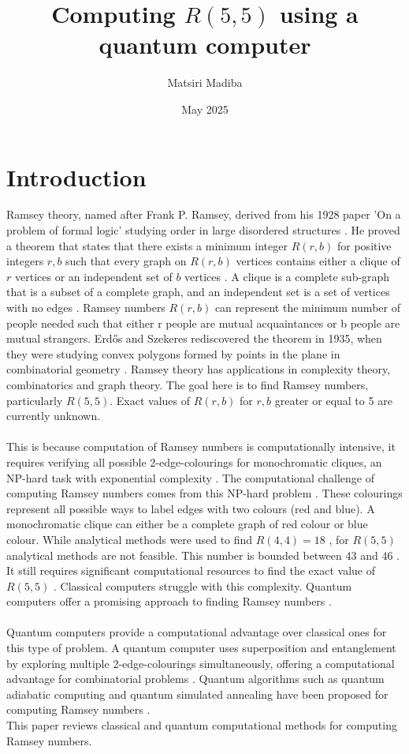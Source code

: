 \documentclass{Assignment}
\author{Matsiri Madiba}
\date{May 2025}
\title{Computing $R(5,5)$ using a quantum computer}
\begin{document}
\maketitle
\newpage
\tableofcontents
\newpage
\section{Introduction}
Ramsey theory, named after Frank P. Ramsey, derived from his 1928 paper 'On a problem of formal logic' studying order in large disordered structures \cite{graham1980ramsey}.
He proved a theorem that states that there exists a minimum integer $R(r,b)$ for positive integers $r, b$ such that every graph on $R(r,b)$ vertices contains either a clique of $r$ vertices or an independent set of $b$ vertices \cite{BondyMurty2008}.
A clique is a complete sub-graph that is a subset of a complete graph, and an independent set is a set of vertices with no edges \cite{BondyMurty2008}.	
Ramsey numbers $R(r,b)$ can represent the minimum number of people needed such that either r people are mutual acquaintances or b people are mutual strangers.
Erd\H{o}s and Szekeres rediscovered the theorem in 1935, when they were studying convex polygons formed by points in the plane in combinatorial geometry \cite{BondyMurty2008}.
Ramsey theory has applications in complexity theory, combinatorics and graph theory. 
The goal here is to find Ramsey numbers, particularly $R(5,5)$.
Exact values of $R(r,b)$ for $r,b$ greater or equal to 5 are currently unknown.
\\\\
This is because computation of Ramsey numbers is computationally intensive, it requires verifying all possible 2-edge-colourings for monochromatic cliques, an NP-hard task with exponential complexity \cite{PhysRevA.93.032301, burr1981generalized}.
The computational challenge of computing Ramsey numbers comes from this NP-hard problem \cite{burr1981generalized}.
These colourings represent all possible ways to label edges with two colours (red and blue).
A monochromatic clique can either be a complete graph of red colour or blue colour.
While analytical methods were used to find $R(4,4)=18$ \cite{GreenwoodGleason1955},
for $R(5,5)$ analytical methods are not feasible.
This number is bounded between 43 \cite{Exoo1993} and 46 \cite{angeltveit2024r55le46}.
It still requires significant computational resources to find the exact value of $R(5,5)$ \cite{spencer1994}.
Classical computers struggle with this complexity.
Quantum computers offer a promising approach to finding Ramsey numbers \cite{PhysRevA.93.032301}.
\\\\
Quantum computers provide a computational advantage over classical ones for this type of problem.
A quantum computer uses superposition and entanglement by exploring multiple 2-edge-colourings simultaneously, offering a computational advantage for combinatorial problems  \cite{Deutsch1989,PhysRevA.93.032301}.
Quantum algorithms such as quantum adiabatic computing and quantum simulated annealing have been proposed for computing Ramsey numbers \cite{gaitan2012ramsey, PhysRevA.93.032301}.
\\
This paper reviews classical and quantum computational methods for computing Ramsey numbers.
\end{document}
